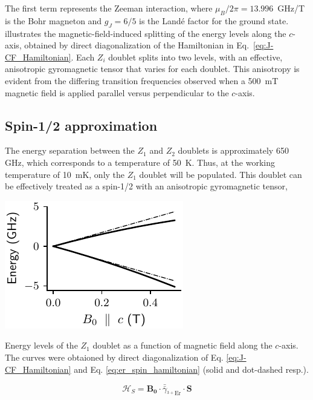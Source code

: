 The first term represents the Zeeman interaction, where $\mu_B/2\pi = 13.996$~GHz/T is the Bohr magneton and $g_J = 6/5$ is the Landé factor for the \Er ground state.  illustrates the magnetic-field-induced splitting of the energy levels along the $c$-axis, obtained by direct diagonalization of the Hamiltonian in Eq.~\ref{eq:J-CF_Hamiltonian}. Each $Z_i$ doublet splits into two levels, with an effective, anisotropic gyromagnetic tensor that varies for each doublet. This anisotropy is evident from the differing transition frequencies observed when a 500~mT magnetic field is applied parallel versus perpendicular to the $c$-axis. 

\subsection{Spin-1/2 approximation}

The energy separation between the $Z_1$ and $Z_2$ doublets is approximately 650 GHz, which corresponds to a temperature of 50~K. Thus, at the working temperature of 10~mK, only the $Z_1$ doublet will be populated. This doublet can be effectively treated as a spin-1/2 with an anisotropic gyromagnetic tensor,

\begin{marginfigure}
    \includegraphics{chapter2/figures/energy_levels_vs_Bz_Z1.pdf}
    \caption[Zeeman splitting of the $Z_1$ doublet]{Energy levels of the $Z_1$ doublet as a function of magnetic field along the $c$-axis. The curves were obtaioned by direct diagonalization of Eq. \ref{eq:J-CF_Hamiltonian} and Eq. \ref{eq:er_spin_hamiltonian} (solid and dot-dashed resp.).}
\end{marginfigure}

\begin{equation}
    \label{eq:er_spin_hamiltonian}
    \mathcal{H}_S = \mathbf{B_0}\cdot \bar{\bar{\gamma}}_{^{3+}\text{Er}}\cdot\mathbf{S}
\end{equation}

